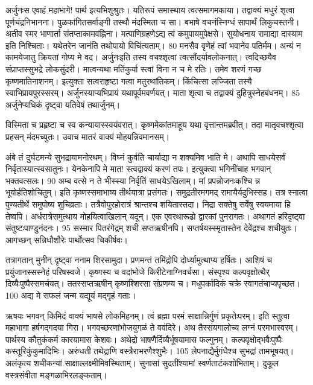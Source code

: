 अर्जुनःस एवाहं महाभागे! पार्थ इत्यभिशुश्रुतः।
 यतिरूपं समास्थाय त्वत्समागमकाया।
 तद्वाक्यं मधुरं शृत्वा पूर्णचंद्रनिभानना।
 पुळकांगितसर्वाङ्गी तस्थौ मंदस्मिता च सा।
 बभाषे वचनंस्निग्धं सापार्थं लिकुचस्तनी।
 अतीव स्मर भाणार्ता संतप्ताकामवह्निना।
 मत्पाणिग्रहणेऽद्य त्वं कमुपायमुपेक्षसे।
 सुयोधनाय रामाद्या दास्याम इति निश्चिताः।
 यथेतरेन जानंति तथोपायो विचिंत्यताम्।
 80 मनसैव वृणेहं त्वां भवानेव पतिर्मम।
 अन्यं न कामयेजातु क्रियतां गोप्य मे वद।
 अर्जुनःइति तस्य वचश्शृत्वा त्वत्सौंदर्यावलोकनात्।
 त्वदिच्छयैव संप्राप्तस्सुभद्रे लोकसुंदरी।
 मात्वन्यथा मतिंकुर्या स्त्वां विना न च मे रतिः।
 तमेव शरणं गच्छ कृष्णमातिनाशनम्।
 इत्युक्ता सत्वराहृष्टा गत्वा मतुरथांतिकम्।
 किंचित्सा लज्जिता तस्यै स्वाभिप्रायपुरस्सरम्।
 अर्जुनस्याप्यभिप्रायं यथापूर्वमवर्णयत्।
 माता शृत्वा च तद्वाक्यं दुहित्रुस्नेहबंधनम्।
 85 अर्जुनेप्यधिकं दृष्ट्वा यतिवेषं तथार्जुनम्।

विस्मिता च प्रहृष्टा च स्व कन्यायास्स्वयंवरात्।
 कृष्णमेकांतमाहूय यथा वृत्तान्तमब्रवीत्।
 तदा मातृवचश्शृत्वा प्रहसन् मंदमच्युतः।
 उवाच मातरं वाक्यं मोहयन्निवमानसम्।
 
अंबे तं दुर्घटमन्ये सुभद्रायामनोरथम्।
 विघ्नं कुर्वति चार्याद्या न शक्यमिव भाति मे।
 अथापि साधयेसर्वं निर्वृतास्यात्स्वसातुनः।
 येनकेनापि मे मात! स्त्वद्वाक्यं करणं तपः।
 इत्युक्त्वा भगिनींचाह भगवान् भक्तवत्सलः।
 90 अम्ब वत्से न ते भीस्स्या निर्वृतिं साधयेऽखिलाम्।
 मां प्रपन्नोजनःकश्चि न्न भूयोर्हतिशोचितुम्।
 इति कृष्णस्समाभाष्य तीर्थयात्रा प्रसंगतः।
 समुद्रतीरमगमद् रामायैर्यदुभिस्सह।
 तत्र स्नात्वा पुण्यतीर्थे समुपोष्य शुचिव्रताः।
 तत्रैवोपुरहोरात्रं श्रान्तश्च शयितास्तदा।
 निद्रा सक्तेषु सर्वेषु स्वयमाया हि तेष्वपि।
 अर्धरात्रेसमुत्थाय मोहयित्वाखिलान् यदून्।
 एक एवरथारूढो द्वारकां पुनरागतः।
 अथागतं हरिदृष्ट्वा संतुष्टःपाण्डुनंदनः।
 95 सस्मार पितरंगेद्रम् शची सप्तऋषीनपि।
 सप्तर्षयस्स्मृतास्तेन देवेंद्रश्च शचीयुतः।
 आगच्छन् सन्निधौशौरेः पार्थोत्सव चिकीर्षवः।
 
तत्रागतान् मुनीन् दृष्ट्वा ननाम शिरसामुदा।
 प्रणमन्तं तमिंद्रोपि दोर्ध्यामुत्थाप्य हर्षितः।
 आशिषं च प्रयुंजानस्सस्नेहं परिषस्वजे।
 कृष्णस्य च वदांभोजे किरीटेनाग्निवर्चसा।
 संस्पृश्य कल्पवृक्षोत्थैर् दिव्यैःपुष्पैस्समर्चयत्।
 ततस्सप्तऋषीन् कृष्णश्शिरसा संप्रणम्य च।
 मधुपर्कादिकं चक्रे स्वागतंचाप्यपृच्छत।
 100 अद्य मे सफलं जन्म यद्यूयं मद्गृहं गताः।
 
ऋषयः
भगवन् किमिदं वाक्यं भाषसे लोकमिहनम्।
 त्वं ब्रह्मा परमं साक्षान्निर्गुणं प्रकृतेःपरम्।
 इति स्तुत्वा महाभागा हर्षगद्गदया गिरा।
 भगवच्छरणांभोजयुगळं ते ववंदिरे।
 अथ तैस्संयगालोच्य लग्नं परमभास्वरम्।
 पार्थस्य कौतुकंकर्म कारयामास केशवः।
 अथेद्रो भाषणैर्दिव्यैर्भूषयामास फल्गुनम्।
 कल्पवृक्षोद्भवैःपुष्पैः कस्तूरिकुंकुमादिभिः।
 अरुंधती तथेद्राणि वस्त्रैराभरणैश्शुभैः।
 105 लेपनाद्यैर्मुगंधैश्च सुभद्रां तामभूषयत्।
 अलंकृत्य शचीकन्यां साक्षाल्लक्ष्मीमिवस्थिताम्।
 सुनासां सुदतींश्यामां स्वर्णताटंकशोभिताम्।
 दुकूल वस्त्रसंवीता मङ्गळाभिरलङ्कताम्।
 
